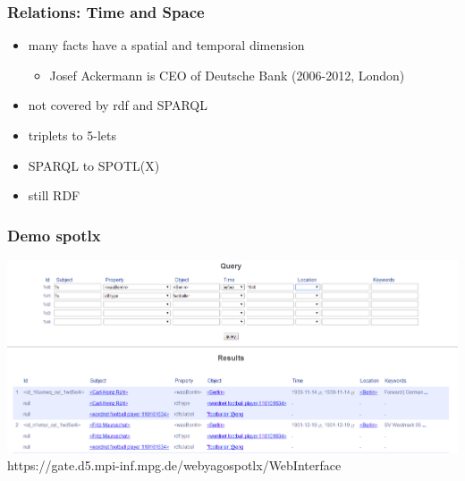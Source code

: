\begin{frame}[fragile]
\frametitle{Relations: Time and Space}
\begin{itemize}
\item many facts have a spatial and temporal dimension
\begin{itemize}
\item Josef Ackermann is CEO of Deutsche Bank (2006-2012, London)
\end{itemize}
\item not covered by rdf and SPARQL
\item triplets to 5-lets
\item SPARQL to SPOTL(X)
\item still RDF
\end{itemize}
\end{frame}

\begin{frame}
\frametitle{Demo spotlx}
\includegraphics[scale=0.2]{img/yago-spotnx.png}\\
https://gate.d5.mpi-inf.mpg.de/webyagospotlx/WebInterface
\end{frame}

